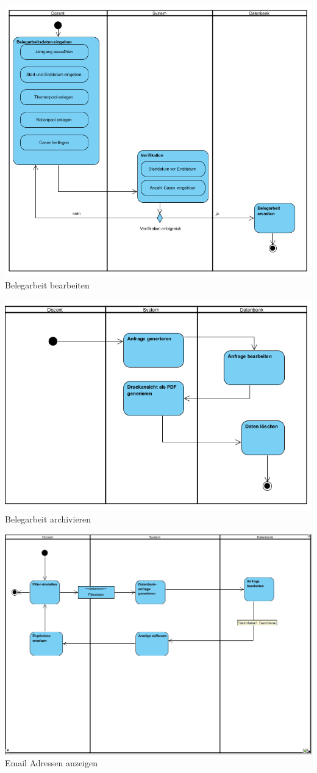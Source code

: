 \documentclass{article}
\begin{document}
\includegraphics[scale=0.75]{bilder/Belegarbeit_bearbeiten_Activity.png}
Belegarbeit bearbeiten

\includegraphics[scale=1]{bilder/Belegarbeit_archivieren_Activity.png}
Belegarbeit archivieren

\includegraphics[scale=0.7]{bilder/Email_Adressen_anzeigen_Activity.png}
Email Adressen anzeigen
\end{document}
